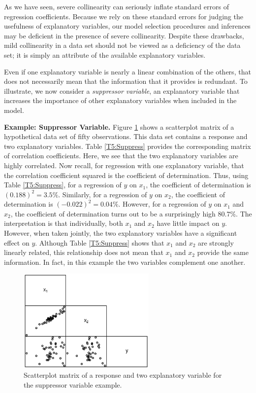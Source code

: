 As we have seen, severe collinearity can seriously inflate standard
errors of regression coefficients. Because we rely on these standard
errors for judging the usefulness of explanatory variables, our
model selection procedures and inferences may be deficient in the
presence of severe collinearity. Despite these drawbacks, mild
collinearity in a data set should not be viewed as a deficiency of
the data set; it is simply an attribute of the available explanatory
variables.

Even if one explanatory variable is nearly a linear combination of
the others, that does not necessarily mean that the information that
it provides is redundant. To illustrate, we now consider a
\textit{suppressor variable}, an explanatory variable that increases
the importance of other explanatory variables when included in the
model.

\linejed{}

\textbf{Example: Suppressor Variable.} Figure \ref{F5:Suppress}
shows a scatterplot matrix of a hypothetical data set of fifty
observations. This data set contains a response and two explanatory
variables. Table \ref{T5:Suppress} provides the corresponding matrix
of correlation coefficients. Here, we see that the two explanatory
variables are highly correlated. Now recall, for regression with one
explanatory variable, that the correlation coefficient squared is
the coefficient of determination. Thus, using Table
\ref{T5:Suppress}, for a regression of $y$ on $x_1$, the coefficient
of determination is $(0.188)^2=3.5\%$. Similarly, for a regression
of $y$ on $x_2$, the coefficient of
determination is $(-0.022)^2=0.04\%$. However, for a regression of $y$ on $%
x_1$ and $x_2$, the coefficient of determination turns out to be a
surprisingly high $80.7\%$. The interpretation is that individually, both $%
x_1$ and $x_2$ have little impact on $y$. However, when taken
jointly, the two explanatory variables have a significant effect on
$y$. Although Table \ref{T5:Suppress} shows that $x_1$ and $x_2$ are
strongly linearly related, this relationship does not mean that
$x_1$ and $x_2$ provide the same information. In fact, in this
example the two variables complement one another.

\begin{figure}[htp]
  \begin{center}
    \includegraphics[width=0.6\textwidth]{Chapter5/F5Suppress.eps}
    \caption{\label{F5:Suppress} \small  Scatterplot matrix of a
response and two explanatory variable for the suppressor variable
example.}
  \end{center}
\end{figure}


